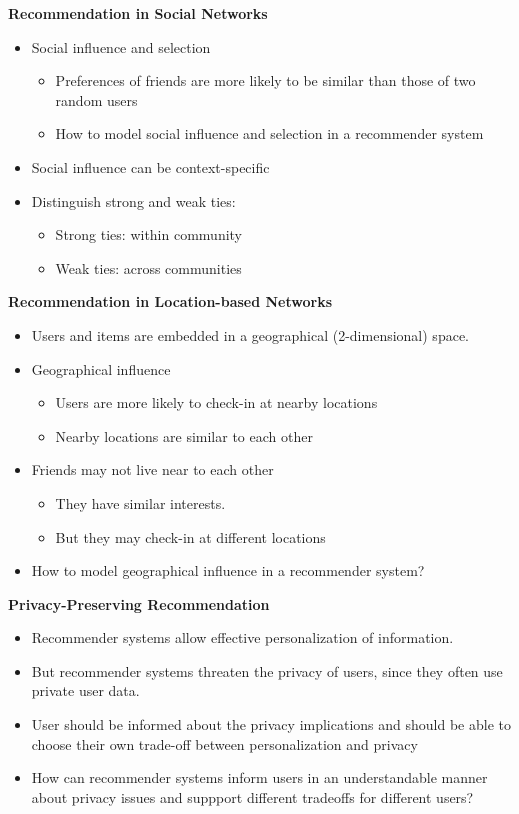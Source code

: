 \documentclass[../notes.tex]{subfiles}
\begin{document}
\textbf{Recommendation in Social Networks}
\begin{itemize}
  \item Social influence and selection
  \begin{itemize}
    \item Preferences of friends are more likely to be similar than those of two random users
    \item How to model social influence and selection in a recommender system
  \end{itemize}

  \item Social influence can be context-specific
  \item Distinguish strong and weak ties:
  \begin{itemize}
    \item Strong ties: within community
    \item Weak ties: across communities
  \end{itemize}
\end{itemize}

\textbf{Recommendation in Location-based Networks}
\begin{itemize}
  \item Users and items are embedded in a geographical (2-dimensional) space.
  \item Geographical influence
  \begin{itemize}
    \item Users are more likely to check-in at nearby locations
    \item Nearby locations are similar to each other
  \end{itemize}

  \item Friends may not live near to each other
  \begin{itemize}
    \item They have similar interests.
    \item But they may check-in at different locations
  \end{itemize}

  \item How to model geographical influence in a recommender system?
\end{itemize}

\textbf{Privacy-Preserving Recommendation}
\begin{itemize}
  \item Recommender systems allow effective personalization of information.
  \item But recommender systems threaten the privacy of users, since they often use private user data.
  \item User should be informed about the privacy implications and should be able to choose their own trade-off between personalization and privacy
  \item How can recommender systems inform users in an understandable manner about privacy issues and suppport different tradeoffs for different users?
\end{itemize}
\end{document}
